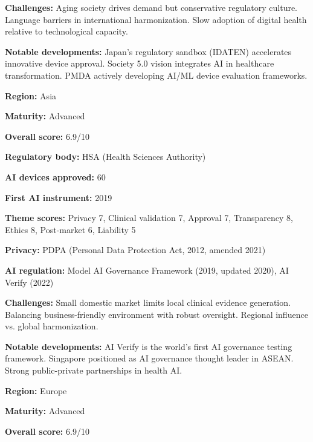 \noindent\textbf{Challenges:} Aging society drives demand but conservative regulatory culture. Language barriers in international harmonization. Slow adoption of digital health relative to technological capacity.\par
\noindent\textbf{Notable developments:} Japan's regulatory sandbox (IDATEN) accelerates innovative device approval. Society 5.0 vision integrates AI in healthcare transformation. PMDA actively developing AI/ML device evaluation frameworks.\par
\vspace{0.55em}
\par
\vspace{0.15em}
\noindent\textbf{Region:} Asia\par
\noindent\textbf{Maturity:} Advanced\par
\noindent\textbf{Overall score:} 6.9/10\par
\noindent\textbf{Regulatory body:} HSA (Health Sciences Authority)\par
\noindent\textbf{AI devices approved:} 60\par
\noindent\textbf{First AI instrument:} 2019\par
\noindent\textbf{Theme scores:} Privacy 7, Clinical validation 7, Approval 7, Transparency 8, Ethics 8, Post-market 6, Liability 5\par
\noindent\textbf{Privacy:} PDPA (Personal Data Protection Act, 2012, amended 2021)\par
\noindent\textbf{AI regulation:} Model AI Governance Framework (2019, updated 2020), AI Verify (2022)\par
\noindent\textbf{Challenges:} Small domestic market limits local clinical evidence generation. Balancing business-friendly environment with robust oversight. Regional influence vs. global harmonization.\par
\noindent\textbf{Notable developments:} AI Verify is the world's first AI governance testing framework. Singapore positioned as AI governance thought leader in ASEAN. Strong public-private partnerships in health AI.\par
\vspace{0.55em}
\par
\vspace{0.15em}
\noindent\textbf{Region:} Europe\par
\noindent\textbf{Maturity:} Advanced\par
\noindent\textbf{Overall score:} 6.9/10\par
